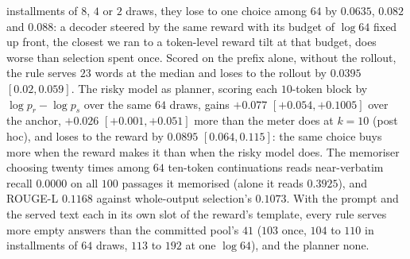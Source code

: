 installments of $8$, $4$ or $2$ draws, they lose to one choice among $64$ by $0.0635$, $0.082$ and $0.088$:
a decoder steered by the same reward with its budget of $\log 64$ fixed up front, the closest we ran to a
token-level reward tilt at that budget, does worse than selection spent once. Scored on the prefix alone,
without the rollout, the rule serves $23$ words at the median and loses to the rollout by $0.0395$
$[0.02, 0.059]$. The risky model as planner, scoring each $10$-token block by $\log p_r - \log p_s$ over the
same $64$ draws, gains $+0.077$ $[+0.054, +0.1005]$ over the anchor, $+0.026$ $[+0.001, +0.051]$ more than
the meter does at $k=10$ (post hoc), and loses to the reward by $0.0895$ $[0.064, 0.115]$: the same choice
buys more when the reward makes it than when the risky model does. The memoriser choosing twenty times among $64$ ten-token continuations
reads near-verbatim recall $0.0000$ on all $100$ passages it memorised (alone it reads $0.3925$), and
ROUGE-L $0.1168$ against whole-output selection's $0.1073$. With the prompt and the served text each in
its own slot of the reward's template, every rule serves more empty answers than the committed pool's $41$ ($103$ once, $104$ to $110$ in
installments of $64$ draws, $113$ to $192$ at one $\log 64$), and the planner none.

